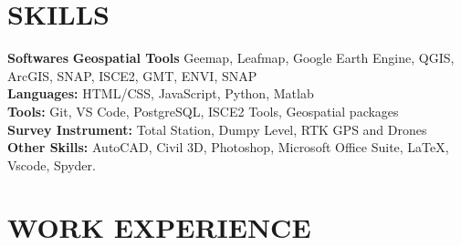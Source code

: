 \documentclass[a4paper,10pt]{article}
\begin{document}
\section*{SKILLS}
\textbf{Softwares}
\textbf{Geospatial Tools} Geemap, Leafmap, Google Earth Engine, QGIS, ArcGIS, 
SNAP, ISCE2, GMT, ENVI, SNAP\\
\textbf{Languages:}  HTML/CSS, JavaScript, Python, Matlab\\
\textbf{Tools:} Git, VS Code, PostgreSQL, ISCE2 Tools, Geospatial packages\\
\textbf{Survey Instrument:} Total Station, Dumpy Level, RTK GPS and Drones\\
\textbf{Other Skills:} AutoCAD, Civil 3D, Photoshop, Microsoft Office Suite, LaTeX, Vscode, Spyder.


\section*{WORK EXPERIENCE}
\end{document}
